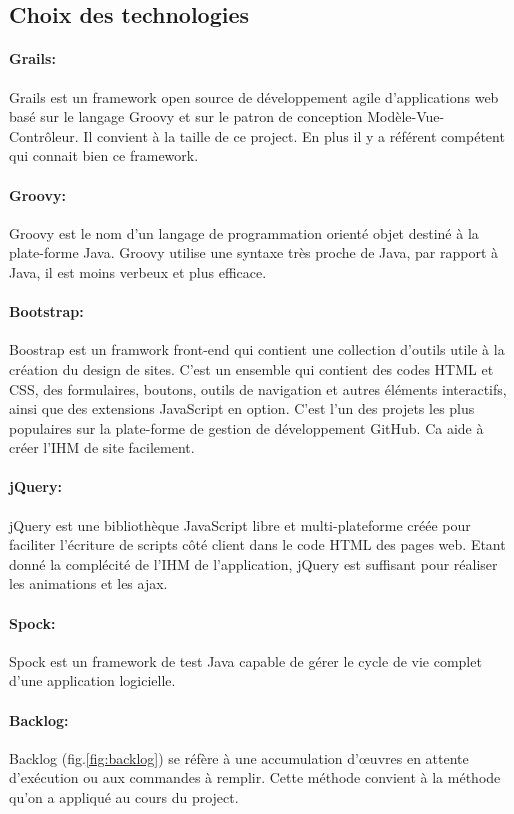 \subsection{Choix des technologies}

\paragraph{Grails:}
Grails est un framework open source de développement agile d'applications web basé sur le langage Groovy et sur le patron de conception Modèle-Vue-Contrôleur.
Il convient à la taille de ce project. En plus il y a référent compétent qui connait bien ce framework.
\paragraph{Groovy:}
Groovy est le nom d'un langage de programmation orienté objet destiné à la plate-forme Java.
Groovy utilise une syntaxe très proche de Java, par rapport à Java, il est moins verbeux et plus efficace.
\paragraph{Bootstrap:}
Boostrap est un framwork front-end qui contient  une collection d'outils utile à la création du design de sites. C'est un ensemble qui contient des codes HTML et CSS, des formulaires, boutons, outils de navigation et autres éléments interactifs, ainsi que des extensions JavaScript en option. C'est l'un des projets les plus populaires sur la plate-forme de gestion de développement GitHub.
Ca aide à créer l'IHM de site facilement.
\paragraph{jQuery:}
jQuery est une bibliothèque JavaScript libre et multi-plateforme créée pour faciliter l'écriture de scripts côté client dans le code HTML des pages web.
Etant donné la complécité de l'IHM de l'application, jQuery est suffisant pour réaliser les animations et les ajax.
\paragraph{Spock:}
Spock est un framework de test Java capable de gérer le cycle de vie complet d'une application logicielle.
\paragraph{Backlog:}
Backlog (fig.\ref{fig:backlog}) se réfère à une accumulation d'œuvres en attente d'exécution ou aux commandes à remplir.
Cette méthode convient à la méthode qu'on a appliqué au cours du project.


